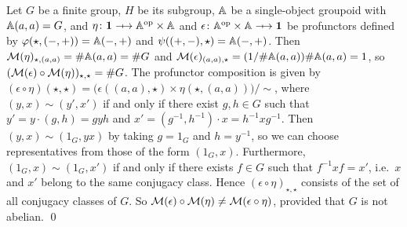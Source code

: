 \newcommand{\TerminalCategory}{\mathbf{1}}
\begin{example}
    Let \( G \) be a finite group, \( H \) be its subgroup, \( \mathbb{A} \) be a single-object groupoid with \( \mathbb{A}(a, a) = G \), and \( \eta \colon \TerminalCategory \profarrow \Grp^{\op} \times \Grp \) and \( \epsilon \colon \Grp^{\op} \times \Grp \profarrow \TerminalCategory \) be profunctors defined by \( \varphi(\star, ({-}, {+})) = \mathbb{A}({-}, {+}) \) and \( \psi(({+}, {-}), \star) = \mathbb{A}({-}, {+}) \).
    Then \( \mathcal{M}({\eta})_{\star, (a,a)} = \#\mathbb{A}(a,a) = \#G \) and \( \mathcal{M}({\epsilon})_{(a,a), \star} = (1/\#\mathbb{A}(a,a))\#\mathbb{A}(a,a) = 1 \), so \( (\mathcal{M}({\epsilon}) \circ \mathcal{M}({\eta}))_{\star, \star} = \#G \).
    The profunctor composition is given by \( (\epsilon \circ \eta)(\star, \star) = \big( \epsilon((a,a), \star) \times \eta(\star, (a,a)) \big) / {\sim} \), where \( (y, x) \sim (y', x') \) if and only if there exist \( g, h \in G \) such that \( y' = y \cdot (g,h) = g y h \) and \( x' = (g^{-1}, h^{-1}) \cdot x = h^{-1} x g^{-1} \).
    Then \( (y, x) \sim (1_G, yx) \) by taking \( g = 1_G \) and \( h = y^{-1} \), so we can choose representatives from those of the form \( (1_G, x) \).
    Furthermore, \( (1_G, x) \sim (1_G, x') \) if and only if there exists \( f \in G \) such that \( f^{-1} x f = x' \), i.e.~\( x \) and \( x' \) belong to the same conjugacy class.
    Hence \( (\epsilon \circ \eta)_{\star, \star} \) consists of the set of all conjugacy classes of \( G \).
    So \( \mathcal{M}({\epsilon}) \circ \mathcal{M}({\eta}) \neq \mathcal{M}({\epsilon \circ \eta}) \), provided that \( G \) is not abelian.
    \qed
\end{example}


